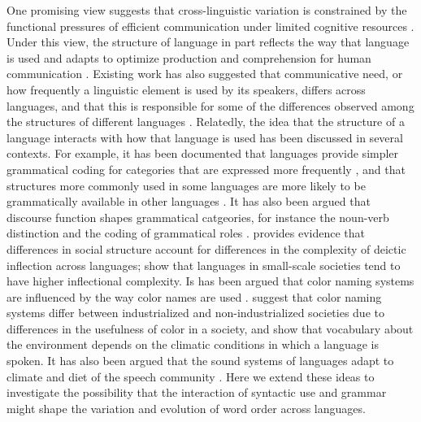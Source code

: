 \documentclass[9pt,twocolumn,twoside,lineno]{pnas-new}
\begin{document}
One promising view suggests that cross-linguistic variation is constrained by the functional pressures of efficient communication under limited cognitive resources \citep{haspelmath2008parametric, jaeger2011on, kemp2018semantic, gibson2019how}.
Under this view, the structure of language in part reflects the way that language is used \citep{hopper1984the, bybee1994the, croft2000explaining, bybee2006from} and adapts to optimize production and comprehension for human communication \citep{hawkins-performance-1994, haspelmath2006against, bybee2010language}.
Existing work has also suggested that communicative need, or how frequently a linguistic element is used by its speakers, differs across languages, and that this is responsible for some of the differences observed among the structures of different languages \cite{perkins1992deixis, lupyan2010language, gibson2017color}. %
Relatedly, the idea that the structure of a language interacts with how that language is used has been discussed in several contexts.
For example, it has  been documented that languages provide simpler grammatical coding for categories that are expressed more frequently \citep{greenberg1966language, haspelmath2006against}, and that structures more commonly used in some languages are more likely to be grammatically available in other languages \citep{keenan1975variation}.
It has also been argued that discourse function shapes grammatical catgeories, for instance the noun-verb distinction \citep{hopper1984the} and the coding of grammatical roles \citep{bois1987the}.
\cite{perkins1992deixis} provides evidence that differences in social structure account for differences in the complexity of deictic inflection across languages; \cite{lupyan2010language} show that languages in small-scale societies tend to have higher inflectional complexity.
Is has been argued that color naming systems are influenced by the way color names are used \cite{zaslavsky2019color}.
\cite{gibson2017color} suggest that color naming systems differ between industrialized and non-industrialized societies due to differences in the usefulness of color in a society, and \cite{regier2016languages} show that vocabulary about the environment depends on the climatic conditions in which a language is spoken.
It has also been argued that the sound systems of languages adapt to climate and diet of the speech community \citep{everett2015climate,blasi2019human}. Here we extend these ideas to investigate the possibility that the interaction of syntactic use and grammar might shape the variation and evolution of word order across languages.
\end{document}
